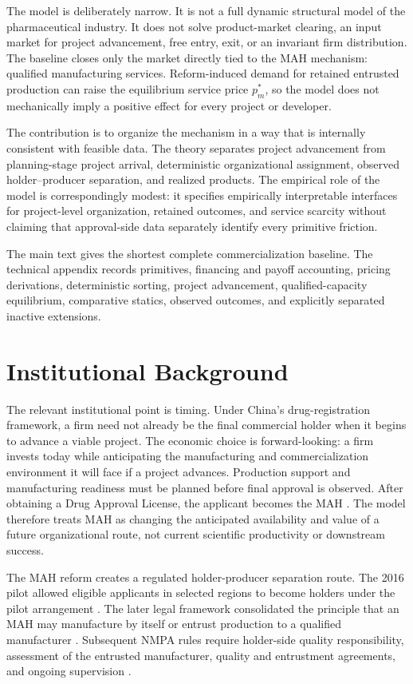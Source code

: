 \documentclass[12pt]{article}
\newcommand{\1}{\mathbf{1}}
\begin{document}
The model is deliberately narrow. It is not a full dynamic structural model
of the pharmaceutical industry. It does not solve product-market clearing,
an input market for project advancement, free entry, exit, or an invariant
firm distribution. The baseline closes only the market directly tied to the
MAH mechanism: qualified manufacturing services. Reform-induced demand for
retained entrusted production can raise the equilibrium service price
\(p_m^*\), so the model does not mechanically imply a positive effect for
every project or developer.

The contribution is to organize the mechanism in a way that is internally
consistent with feasible data. The theory separates project advancement from
planning-stage project arrival, deterministic organizational assignment,
observed holder--producer separation, and realized products. The empirical
role of the model is correspondingly modest: it specifies empirically interpretable
interfaces for project-level organization, retained outcomes, and service
scarcity without claiming that approval-side data separately identify every
primitive friction.

The main text gives the shortest complete commercialization baseline. The
technical appendix records primitives, financing and payoff accounting,
pricing derivations, deterministic sorting, project advancement,
qualified-capacity equilibrium, comparative statics, observed outcomes, and
explicitly separated inactive extensions.

\section{Institutional Background}

The relevant institutional point is timing. Under China's drug-registration
framework, a firm need not already be the final commercial holder when it
begins to advance a viable project. The economic choice is forward-looking: a
firm invests today while anticipating the manufacturing and commercialization
environment it will face if a project advances. Production support and
manufacturing readiness must be planned before final approval is observed.
After obtaining a Drug Approval License, the applicant becomes the MAH
\citep{NMPARegistration2022}. The model therefore treats MAH as changing the
anticipated availability and value of a future organizational route, not
current scientific productivity or downstream success.

The MAH reform creates a regulated holder-producer separation route. The 2016
pilot allowed eligible applicants in selected regions to become holders under
the pilot arrangement
\citep{StateCouncilMAHPilot2016,CFDAMAHImplementation2016}. The later legal
framework consolidated the principle that an MAH may manufacture by itself or
entrust production to a qualified manufacturer
\citep{DrugAdministrationLaw2019}. Subsequent NMPA rules require holder-side
quality responsibility, assessment of the entrusted manufacturer, quality and
entrustment agreements, and ongoing supervision
\citep{NMPAHolderResponsibility2022,NMPAManufacturing2022,NMPAEntrustedProduction2023}.
\end{document}

